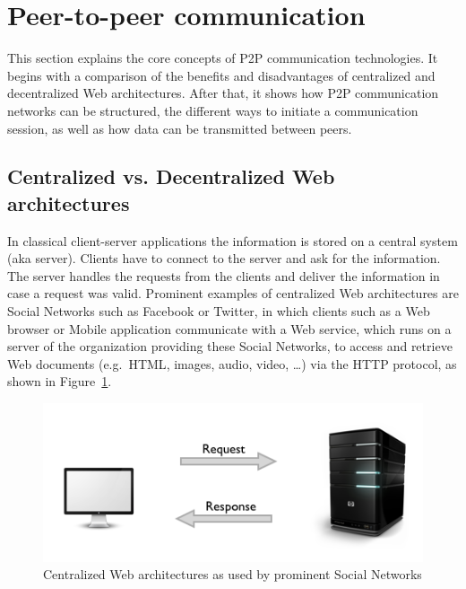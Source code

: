 
\section{Peer-to-peer communication}
\label{sec:p2p_communication}

This section explains the core concepts of \gls{P2P} communication technologies. It begins with a comparison of the benefits and disadvantages of centralized and decentralized Web architectures. After that, it shows how \gls{P2P} communication networks can be structured, the different ways to initiate a communication session, as well as how data can be transmitted between peers.

\subsection{Centralized vs. Decentralized Web architectures}
\label{sec:central_decentral_arch}

In classical client-server applications the information is stored on a central system (aka server). Clients have to connect to the server and ask for the information. The server handles the requests from the clients and deliver the information in case a request was valid. Prominent examples of centralized Web architectures are Social Networks such as Facebook or Twitter, in which clients such as a Web browser or Mobile application communicate with a Web service, which runs on a server of the organization providing these Social Networks, to access and retrieve Web documents (e.g.\ \gls{HTML}, images, audio, video, \ldots) via the \gls{HTTP} protocol, as shown in Figure~\ref{fig:p2p_central_server}. \@

\begin{figure}[H]
	\centering
		\includegraphics[width=0.9\columnwidth]{images/client-server-web.png}
	\caption[Centralized Web architectures as used by prominent Social Networks]{Centralized Web architectures as used by prominent Social Networks \citep{codeTuts}}
\label{fig:p2p_central_server}
\end{figure}

